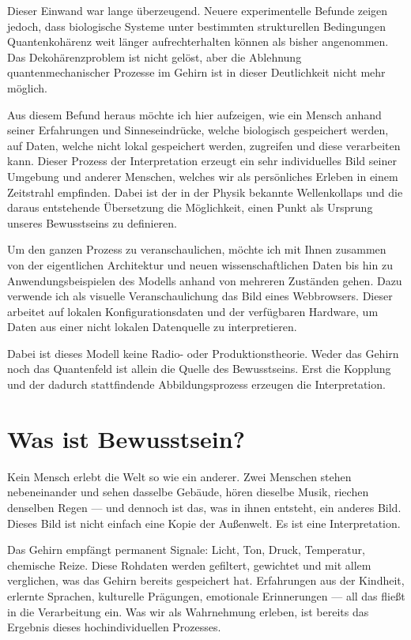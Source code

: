 \documentclass[11pt,a4paper]{article}
\begin{document}
Dieser Einwand war lange überzeugend. Neuere experimentelle Befunde zeigen jedoch,
dass biologische Systeme unter bestimmten strukturellen Bedingungen Quantenkohärenz
weit länger aufrechterhalten können als bisher angenommen. Das Dekohärenzproblem ist
nicht gelöst, aber die Ablehnung quantenmechanischer Prozesse im Gehirn
ist in dieser Deutlichkeit nicht mehr möglich.

Aus diesem Befund heraus möchte ich hier aufzeigen, wie ein Mensch anhand seiner
Erfahrungen und Sinneseindrücke, welche biologisch gespeichert werden, auf Daten,
welche nicht lokal gespeichert werden, zugreifen und diese verarbeiten kann. Dieser
Prozess der Interpretation erzeugt ein sehr individuelles Bild seiner Umgebung und
anderer Menschen, welches wir als persönliches Erleben in einem Zeitstrahl empfinden.
Dabei ist der in der Physik bekannte Wellenkollaps und die daraus entstehende
Übersetzung die Möglichkeit, einen Punkt als Ursprung unseres Bewusstseins zu
definieren.

Um den ganzen Prozess zu veranschaulichen, möchte ich mit Ihnen zusammen von der
eigentlichen Architektur und neuen wissenschaftlichen Daten bis hin zu
Anwendungsbeispielen des Modells anhand von mehreren Zuständen gehen.
Dazu verwende ich als visuelle Veranschaulichung das Bild eines Webbrowsers. Dieser
arbeitet auf lokalen Konfigurationsdaten und der verfügbaren Hardware, um Daten aus
einer nicht lokalen Datenquelle zu interpretieren.

Dabei ist dieses Modell keine Radio- oder Produktionstheorie. Weder das Gehirn noch
das Quantenfeld ist allein die Quelle des Bewusstseins. Erst die Kopplung und der
dadurch stattfindende Abbildungsprozess erzeugen die Interpretation.

\section{Was ist Bewusstsein?}

Kein Mensch erlebt die Welt so wie ein anderer. Zwei Menschen stehen nebeneinander
und sehen dasselbe Gebäude, hören dieselbe Musik, riechen denselben Regen — und
dennoch ist das, was in ihnen entsteht, ein anderes Bild. Dieses Bild ist nicht
einfach eine Kopie der Außenwelt. Es ist eine Interpretation.

Das Gehirn empfängt permanent Signale: Licht, Ton, Druck, Temperatur, chemische
Reize. Diese Rohdaten werden gefiltert, gewichtet und mit allem verglichen, was das
Gehirn bereits gespeichert hat. Erfahrungen aus der Kindheit, erlernte Sprachen,
kulturelle Prägungen, emotionale Erinnerungen — all das fließt in die Verarbeitung
ein. Was wir als Wahrnehmung erleben, ist bereits das Ergebnis dieses hochindividuellen
Prozesses.
\end{document}

